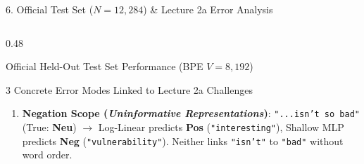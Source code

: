 \documentclass[aspectratio=169, 9pt]{beamer}
\begin{document}
\begin{frame}{6. Official Test Set ($N = 12,284$) \& Lecture 2a Error Analysis}
\vspace{-2mm}
\begin{columns}[T, onlytextwidth]
  \begin{column}{0.48\textwidth}
    \begin{block}{Official Held-Out Test Set Performance (BPE $V = 8,192$)}
      \scriptsize
      \centering
      \renewcommand{\arraystretch}{1.02}
    \end{block}
    \vspace{-2mm}
    \begin{alertblock}{3 Concrete Error Modes Linked to Lecture 2a Challenges}
      \scriptsize
      \begin{enumerate}\setlength{\itemsep}{1pt}
        \item \textbf{Negation Scope (\textit{Uninformative Representations})}: \texttt{"...isn't so bad"} (True: \textbf{Neu}) $\to$ Log-Linear predicts \textbf{Pos} (\texttt{"interesting"}), Shallow MLP predicts \textbf{Neg} (\texttt{"vulnerability"}). Neither links \texttt{"isn't"} to \texttt{"bad"} without word order.

\end{enumerate}
\end{alertblock}
\end{column}
\end{columns}
\end{frame}
\end{document}
